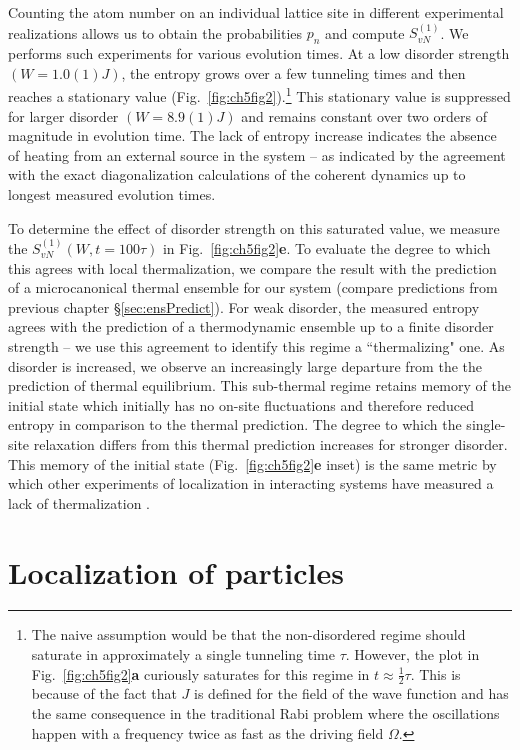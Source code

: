 Counting the atom number on an individual lattice site in different experimental realizations allows us to obtain the probabilities $p_n$ and compute $S^{(1)}_{vN}$. We performs such experiments for various evolution times. At a low disorder strength $(W=1.0(1)J)$, the entropy grows over a few tunneling times and then reaches a stationary value (Fig.~\ref{fig:ch5fig2}).\footnote{The naive assumption would be that the non-disordered regime should saturate in approximately a single tunneling time $\tau$. However, the plot in Fig.~\ref{fig:ch5fig2}\textbf{a} curiously saturates for this regime in $t\approx \frac{1}{2}\tau$. This is because of the fact that $J$ is defined for the field of the wave function and has the same consequence in the traditional Rabi problem where the oscillations happen with a frequency twice as fast as the driving field $\Omega$.} This stationary value is suppressed for larger disorder $(W=8.9(1)J)$ and remains constant over two orders of magnitude in evolution time. The lack of entropy increase indicates the absence of heating from an external source in the system -- as indicated by the agreement with the exact diagonalization calculations of the coherent dynamics up to longest measured evolution times.

To determine the effect of disorder strength on this saturated value, we measure the $S^{(1)}_{vN}(W,t=100\tau)$ in Fig.~\ref{fig:ch5fig2}\textbf{e}. To evaluate the degree to which this agrees with local thermalization, we compare the result with the prediction of a microcanonical thermal ensemble for our system (compare predictions from previous chapter \S \ref{sec:ensPredict}). For weak disorder, the measured entropy agrees with the prediction of a thermodynamic ensemble up to a finite disorder strength -- we use this agreement to identify this regime a ``thermalizing" one. As disorder is increased, we observe an increasingly large departure from the the prediction of thermal equilibrium. This sub-thermal regime retains memory of the initial state which initially has no on-site fluctuations and therefore reduced entropy in comparison to the thermal prediction. The degree to which the single-site relaxation differs from this thermal prediction increases for stronger disorder. This memory of the initial state (Fig.~\ref{fig:ch5fig2}\textbf{e} inset) is the same metric by which other experiments of localization in interacting systems have measured a lack of thermalization \cite{Schreiber2015,Bordia2016,Smith2016,Choi2016,Luschen2017}.

\section{Localization of particles}

